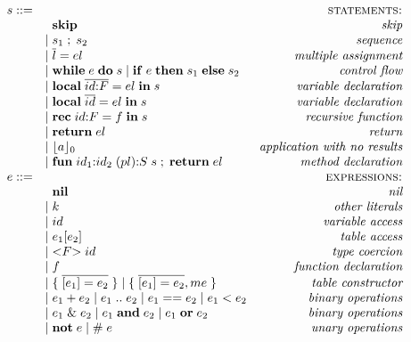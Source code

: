 \documentclass[preprint]{sigplanconf}
\begin{document}
\begin{figure*}[t]
	$$
	\begin{array}{rlr}
	s ::= & & \textsc{statements:}\\
	& \;\; \mathbf{skip} & \textit{skip}\\
	& | \; s_{1} \; ; \; s_{2} & \textit{sequence}\\
	& | \; \overline{l} = el & \textit{multiple assignment}\\
	& | \; \mathbf{while} \; e \; \mathbf{do} \; s \;
	| \; \mathbf{if} \; e \; \mathbf{then} \; s_{1} \; \mathbf{else} \; s_{2} & \textit{control flow}\\
	& | \; \mathbf{local} \; \overline{id{:}F} = el \; \mathbf{in} \; s & \textit{variable declaration}\\
	& | \; \mathbf{local} \; \overline{id} = el \; \mathbf{in} \; s & \textit{variable declaration}\\
	& | \; \mathbf{rec} \; id{:}F = f \; \mathbf{in} \; s & \textit{recursive function} \\
	& | \; \mathbf{return} \; el & \textit{return} \\
	& | \; \lfloor a \rfloor_{0} & \textit{application with no results}\\
	& | \; \mathbf{fun} \; id_{1}{:}id_{2} \; (pl){:}S \; s \;;\; \mathbf{return} \; el & \textit{method declaration}\\
	e ::= & & \textsc{expressions:}\\
	& \;\; \mathbf{nil} & \textit{nil}\\
	& | \; k & \textit{other literals}\\
	& | \; id & \textit{variable access}\\
	& | \; e_{1}[e_{2}] & \textit{table access}\\
	& | \; {<}F{>} \; id & \textit{type coercion}\\
	& | \; f & \textit{function declaration}\\
	& | \; \{ \; \overline{[e_{1}] = e_{2}} \; \} \;
	| \; \{ \; \overline{[e_{1}] = e_{2}},me \; \} & \textit{table constructor}\\
	& | \; e_{1} + e_{2} \;
	| \; e_{1} \; {..} \; e_{2} \;
	| \; e_{1} == e_{2} \;
	| \; e_{1} < e_{2} & \textit{binary operations}\\
	& | \; e_{1} \;\&\; e_{2} \;
	| \; e_{1} \; \mathbf{and} \; e_{2} \;
	| \; e_{1} \; \mathbf{or} \; e_{2} & \textit{binary operations}\\
	& | \; \mathbf{not} \; e \;
	| \; \# \; e & \textit{unary operations} \\

\end{array}$$
\end{figure*}
\end{document}
